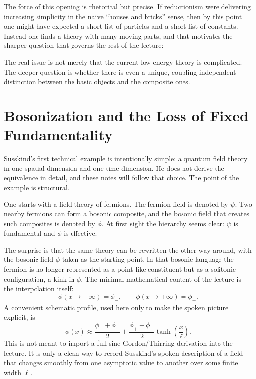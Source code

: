 The force of this opening is rhetorical but precise. If reductionism were delivering increasing simplicity in the naive ``houses and bricks'' sense, then by this point one might have expected a short list of particles and a short list of constants. Instead one finds a theory with many moving parts, and that motivates the sharper question that governs the rest of the lecture:

\begin{remark}
The real issue is not merely that the current low-energy theory is complicated. The deeper question is whether there is even a unique, coupling-independent distinction between the basic objects and the composite ones.
\end{remark}

\section{Bosonization and the Loss of Fixed Fundamentality}

Susskind's first technical example is intentionally simple: a quantum field theory in one spatial dimension and one time dimension. He does not derive the equivalence in detail, and these notes will follow that choice. The point of the example is structural.

One starts with a field theory of fermions. The fermion field is denoted by \(\psi\). Two nearby fermions can form a bosonic composite, and the bosonic field that creates such composites is denoted by \(\phi\). At first sight the hierarchy seems clear: \(\psi\) is fundamental and \(\phi\) is effective.

The surprise is that the same theory can be rewritten the other way around, with the bosonic field \(\phi\) taken as the starting point. In that bosonic language the fermion is no longer represented as a point-like constituent but as a solitonic configuration, a kink in \(\phi\). The minimal mathematical content of the lecture is the interpolation itself:
\begin{equation}
\phi(x\to -\infty)=\phi_-,
\qquad
\phi(x\to +\infty)=\phi_+.
\end{equation}
A convenient schematic profile, used here only to make the spoken picture explicit, is
\begin{equation}
\phi(x)\approx \frac{\phi_++\phi_-}{2}
+
\frac{\phi_+-\phi_-}{2}\tanh\!\left(\frac{x}{\ell}\right).
\end{equation}
This is not meant to import a full sine-Gordon/Thirring derivation into the lecture. It is only a clean way to record Susskind's spoken description of a field that changes smoothly from one asymptotic value to another over some finite width \(\ell\).

